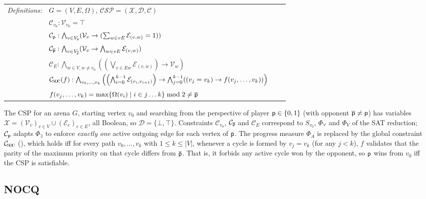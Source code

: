 \documentclass[12pt]{extarticle}
\newcommand{\definition}[1] {
    \begin{tcolorbox}[colback=mygray,colframe=mygray,sharp corners=all,top=0.01cm,bottom=0.01cm,left=0.1cm]
    \small
    \setlength{\tabcolsep}{2pt}
    \begin{tabular}{l l l l}
        \textit{Definitions:} & #1
    \end{tabular}
    \end{tcolorbox}
}
\begin{document}
\definition{
    $G=(V,E,\Omega)$, $\mathcal{CSP = (X, D, C)}$
    \\ & $\mathcal{C}_{v_0} : \mathcal{V}_{v_0} = \top$
    \\ & $\mathcal{C}_{\mathsf{p}} : \bigwedge_{v \in V_{\mathsf{p}}} (\mathcal{V}_v \rightarrow (\sum_{w \in vE} \mathcal{E}_{(v,w)}= 1))$
    \\ & $\mathcal{C}_{\overline{\mathsf{p}}} : \bigwedge_{v \in V_{\overline{\mathsf{p}}}} (\mathcal{V}_v \rightarrow \bigwedge_{w \in vE} \mathcal{E}_{(v,w)})$
    \\ & $\mathcal{C}_{\!E} : \bigwedge_{w \in V, w \neq v_0} ((\bigvee_{v \in Ew} \mathcal{E}_{(v,w)}) \rightarrow \mathcal{V}_w)$
    \\ & $\mathcal{C}_{\subnoc}(f) : \bigwedge_{v_0, \dots, v_k} \left( \left(\bigwedge_{i=0}^{k-1} \mathcal{E}_{(v_i,v_{i+1})}\right) \to \bigwedge_{j=0}^{k-1} ((v_j = v_k) \to f(v_j, \dots, v_k)) \right)$
    \\ & $f(v_j, \dots, v_k) = \max\{\Omega(v_i) \mid i\in j\dots k\} \bmod 2 \ne \overline{\mathsf{p}}$
}
The CSP for an arena $G$, starting vertex $v_0$ and searching from the perspective of player $\mathsf{p} \in \{0,1\}$ (with opponent $\overline{\mathsf{p}} \neq \mathsf{p}$) has variables $\mathcal{X} = (\mathcal{V}_v)_{v \in V} \cup (\mathcal{E}_e)_{e \in E}$, all Boolean, so $\mathcal{D} = \{\bot,\top\}$. Constraints $\mathcal{C}_{v_0}$, $\mathcal{C}_{\overline{\mathsf{p}}}$ and $\mathcal{C}_{\!E}$ correspond to $S_{v_0}$, $\Phi_\forall$ and $\Phi_V$ of the SAT reduction; $\mathcal{C}_{\mathsf{p}}$ adapts $\Phi_\exists$ to enforce \textit{exactly one} active outgoing edge for each vertex of $\mathsf{p}$. The progress measure $\Phi_A$ is replaced by the global constraint $\mathcal{C}_{\subnoc}$ (\noc), which holds iff for every path $v_0,\ldots,v_k$ with $1 \leq k \leq |V|$, whenever a cycle is formed by $v_j = v_k$ (for any $j < k$), $f$ validates that the parity of the maximum priority on that cycle differs from $\overline{\mathsf{p}}$. That is, it forbids any active cycle won by the opponent, so $\mathsf{p}$ wins from $v_0$ iff the CSP is satisfiable.

\subsection{NOCQ}
\end{document}
